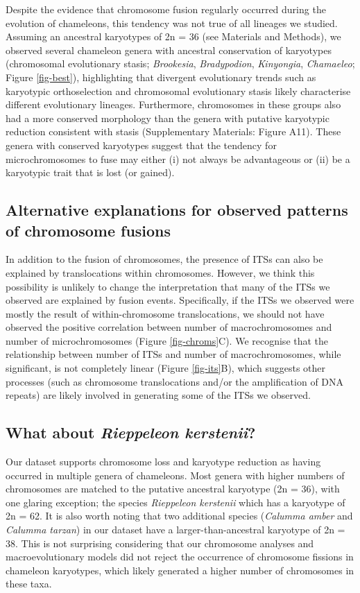 \documentclass[a4paper, 12pt]{article}
\begin{document}
Despite the evidence that chromosome fusion regularly occurred during the evolution of chameleons, this tendency was not true of all lineages we studied. Assuming an ancestral karyotypes of 2n = 36\cite{rovatsos2017evolution} (see Materials and Methods), we observed several chameleon genera with ancestral conservation of karyotypes (chromosomal evolutionary stasis; \textit{Brookesia}, \textit{Bradypodion}, \textit{Kinyongia}, \textit{Chamaeleo}; Figure \ref{fig-best}), highlighting that divergent evolutionary trends such as karyotypic orthoselection and chromosomal evolutionary stasis likely characterise different evolutionary lineages. 
Furthermore, chromosomes in these groups also had a more conserved morphology than the genera with putative karyotypic reduction consistent with stasis (Supplementary Materials: Figure A11). 
These genera with conserved karyotypes suggest that the tendency for microchromosomes to fuse may either (i) not always be advantageous or (ii) be a karyotypic trait that is lost (or gained). 

\subsection{Alternative explanations for observed patterns of chromosome fusions}
In addition to the fusion of chromosomes, the presence of ITSs can also be explained by translocations within chromosomes\cite{bolzan2017interstitial}. 
However, we think this possibility is unlikely to change the interpretation that many of the ITSs we observed are explained by fusion events. 
Specifically, if the ITSs we observed were mostly the result of within-chromosome translocations, we should not have observed the positive correlation between number of macrochromosomes and number of microchromosomes (Figure \ref{fig-chroms}C). 
We recognise that the relationship between number of ITSs and number of macrochromosomes, while significant, is not completely linear (Figure \ref{fig-its}B), which suggests other processes (such as chromosome translocations and/or the amplification of DNA repeats) are likely involved in generating some of the ITSs we observed.

\subsection{What about \textit{Rieppeleon kerstenii}?}
Our dataset supports chromosome loss and karyotype reduction as having occurred in multiple genera of chameleons. 
Most genera with higher numbers of chromosomes are matched to the putative ancestral karyotype (2n = 36), with one glaring exception; the species \textit{Rieppeleon kerstenii} which has a karyotype of 2n = 62. 
It is also worth noting that two additional species (\textit{Calumma amber} and \textit{Calumma tarzan}) in our dataset have a larger-than-ancestral karyotype of 2n = 38. 
This is not surprising considering that our chromosome analyses and macroevolutionary models did not reject the occurrence of chromosome fissions in chameleon karyotypes, which likely generated a higher number of chromosomes in these taxa.
\end{document}
